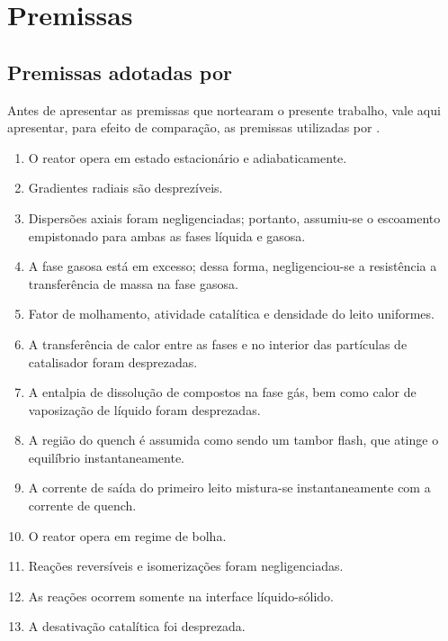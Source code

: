 
\section{Premissas} \label{sec:premissas}

\subsection{Premissas adotadas por }
\label{sec:premissasrojas}

Antes de apresentar as premissas que nortearam o presente trabalho, vale
aqui apresentar, para efeito de comparação, as premissas utilizadas por
.

\begin{enumerate}
  \item O reator opera em estado estacionário e adiabaticamente.
  \item Gradientes radiais são desprezíveis.
  \item Dispersões axiais foram negligenciadas; portanto, assumiu-se o
  escoamento empistonado para ambas as fases líquida e gasosa.
  \item A fase gasosa está em excesso; dessa forma, negligenciou-se a
  resistência a transferência de massa na fase gasosa.
  \item Fator de molhamento, atividade catalítica e densidade do leito
  uniformes.
  \item A transferência de calor entre as fases e no interior das partículas de
  catalisador foram desprezadas.
  \item A entalpia de dissolução de compostos na fase gás, bem como calor de
  vaposização de líquido foram desprezadas.
  \item A região do quench é assumida como sendo um tambor flash, que atinge o
  equilíbrio instantaneamente.
  \item A corrente de saída do primeiro leito mistura-se instantaneamente com a
  corrente de quench.
  \item O reator opera em regime de bolha.
  \item Reações reversíveis e isomerizações foram negligenciadas.
  \item As reações ocorrem somente na interface líquido-sólido.
  \item A desativação catalítica foi desprezada.
\end{enumerate}


